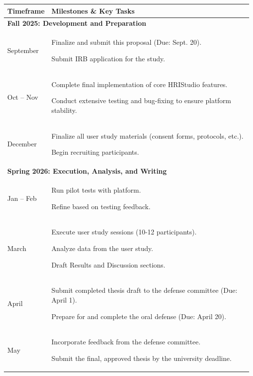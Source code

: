 \documentclass[numbib]{buthesis_p}  %
\begin{document}
\begin{table}[h!]
\centering
\renewcommand{\arraystretch}{1.5}
\begin{tabularx}{\textwidth}{|l|X|}
\hline
\textbf{Timeframe} & \textbf{Milestones \& Key Tasks} \\
\hline
\multicolumn{2}{|l|}{\textbf{Fall 2025: Development and Preparation}} \\
\hline
September & Finalize and submit this proposal (Due: Sept. 20).

Submit IRB application for the study. \\
\hline
Oct -- Nov & Complete final implementation of core HRIStudio features.

Conduct extensive testing and bug-fixing to ensure platform stability. \\
\hline
December & Finalize all user study materials (consent forms, protocols, etc.).

Begin recruiting participants. \\
\hline
\multicolumn{2}{|l|}{\textbf{Spring 2026: Execution, Analysis, and Writing}} \\
\hline
Jan -- Feb & Run pilot tests with platform.

Refine based on testing feedback. \\
\hline
March & Execute user study sessions (10-12 participants).

Analyze data from the user study.

Draft Results and Discussion sections. \\
\hline
April & Submit completed thesis draft to the defense committee (Due: April 1).

Prepare for and complete the oral defense (Due: April 20). \\
\hline
May & Incorporate feedback from the defense committee.

Submit the final, approved thesis by the university deadline. \\
\hline
\end{tabularx}
\end{table}
\end{document}
